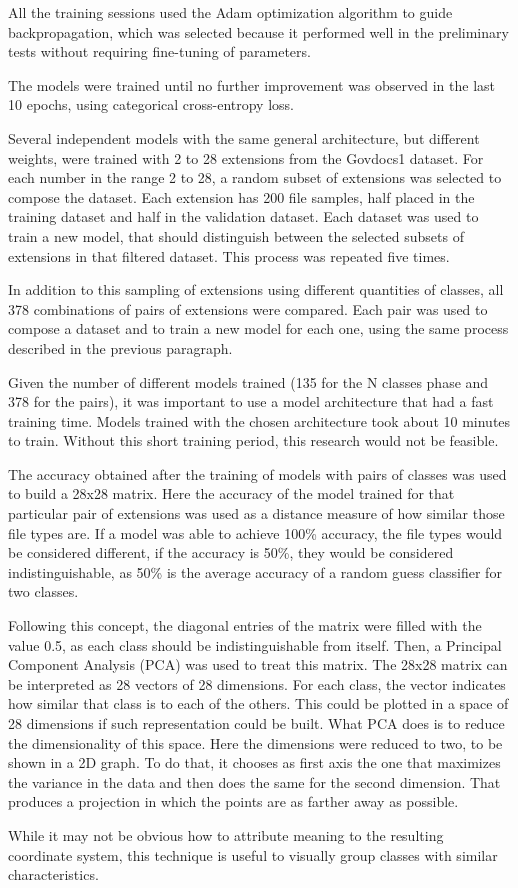 All the training sessions used the Adam \cite{kingma_adam:_2014}
optimization algorithm to guide backpropagation, which was selected because it performed well in the preliminary tests without requiring fine-tuning of parameters.

The models were trained until no further improvement was observed in the last 10 epochs, using categorical cross-entropy loss.

Several independent models with the same general architecture, but different weights, were trained with 2 to 28 extensions from the Govdocs1 dataset. For each number in the range 2 to 28, a random subset of extensions was selected to compose the dataset. Each extension has 200 file samples, half placed in the training dataset and half in the validation dataset. Each dataset was used to train a new model, that should distinguish between the selected subsets of extensions in that filtered dataset. This process was repeated five times.

In addition to this sampling of extensions using different quantities of classes, all 378 combinations of pairs of extensions were compared. Each pair was used to compose a dataset and to train a new model for each one, using the same process described in the previous paragraph.

Given the number of different models trained (135 for the N classes phase and 378 for the pairs), it was important to use a model architecture that had a fast training time. Models trained with the chosen architecture took about 10 minutes to train. Without this short training period, this research would not be feasible.

The accuracy obtained after the training of models with pairs of classes was used to build a 28x28 matrix. Here the accuracy of the model trained for that particular pair of extensions was used as a distance measure of how similar those file types are. If a model was able to achieve 100\% accuracy, the file types would be considered different, if the accuracy is 50\%, they would be considered indistinguishable, as 50\% is the average accuracy of a random guess classifier for two classes.

Following this concept, the diagonal entries of the matrix were filled with the value 0.5, as each class should be indistinguishable from itself. Then, a Principal Component Analysis (PCA) \cite{amirani_new_2008} was used to treat this matrix. The 28x28 matrix can be interpreted as 28 vectors of 28 dimensions. For each class, the vector indicates how similar that class is to each of the others. This could be plotted in a space of 28 dimensions if such representation could be built. What PCA does is to reduce the dimensionality of this space. Here the dimensions were reduced to two, to be shown in a 2D graph. To do that, it chooses as first axis the one that maximizes the variance in the data and then does the same for the second dimension. That produces a projection in which the points are as farther away as possible.

While it may not be obvious how to attribute meaning to the resulting coordinate system, this technique is useful to visually group classes with similar characteristics.

